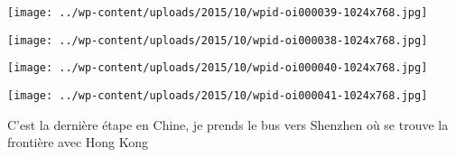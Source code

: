  

\begin{center} \texttt{[image: ../wp-content/uploads/2015/10/wpid-oi000039-1024x768.jpg]} \end{center}

 

 

\begin{center} \texttt{[image: ../wp-content/uploads/2015/10/wpid-oi000038-1024x768.jpg]} \end{center}

 

 

\begin{center} \texttt{[image: ../wp-content/uploads/2015/10/wpid-oi000040-1024x768.jpg]} \end{center}

 

 

\begin{center} \texttt{[image: ../wp-content/uploads/2015/10/wpid-oi000041-1024x768.jpg]} \end{center}

 

 C'est la dernière étape en Chine, je prends le bus vers Shenzhen où se trouve la frontière avec Hong Kong


 
 
